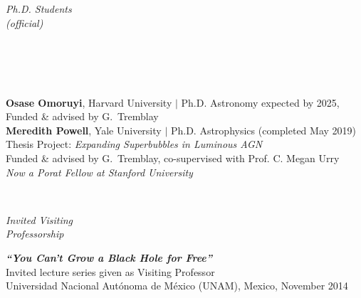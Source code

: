 \documentclass[11pt]{article}
\begin{document}
\hspace{2.5mm} \parbox{1.5in}{\textit{Ph.D. Students \\ (official) \\\\\\\\\\}} \parbox{5.15in}{


\textbf{Osase Omoruyi}, Harvard University $|$ Ph.D. Astronomy expected by 2025,
\\Funded \& advised by G.~Tremblay\\

\textbf{Meredith Powell}, Yale University $|$ Ph.D. Astrophysics (completed May 2019)\\ Thesis Project: \textit{Expanding Superbubbles in Luminous AGN}\\
Funded \& advised by G.~Tremblay,
co-supervised with Prof. C. Megan Urry\\
\textit{Now a Porat Fellow at Stanford University}
}\\


\vspace{4mm}



\hspace{2.5mm} \parbox{1.5in}{\textit{Invited Visiting \\ Professorship \\ }} \parbox{5.15in}{ \textit{\textbf{``You Can't Grow a Black Hole for Free''}}\\ Invited lecture series given as Visiting Professor \\ Universidad Nacional Aut\'{o}noma de M\'{e}xico (UNAM), Mexico, November 2014}\\



\vspace{4mm}
\end{document}
